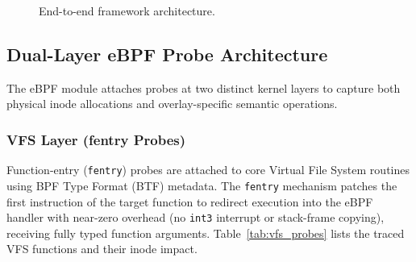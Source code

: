 \documentclass[conference]{IEEEtran}
\begin{document}
\begin{figure}[!htbp]
    \centering
    
    \caption{End-to-end framework architecture.}
    \label{fig:architecture}
\end{figure}

\subsection{Dual-Layer eBPF Probe Architecture}
\label{subsec:probes}

The eBPF module attaches probes at two distinct kernel layers to capture both physical inode allocations and overlay-specific semantic operations.

\subsubsection{VFS Layer (fentry Probes)}
Function-entry (\texttt{fentry}) probes are attached to core Virtual File System routines using BPF Type Format (BTF) metadata. The \texttt{fentry} mechanism patches the first instruction of the target function to redirect execution into the eBPF handler with near-zero overhead (no \texttt{int3} interrupt or stack-frame copying), receiving fully typed function arguments. Table~\ref{tab:vfs_probes} lists the traced VFS functions and their inode impact.

\begin{table}[t]
\centering
\caption{VFS-layer probes attached via \texttt{fentry}.}
\label{tab:vfs_probes}
\small
{}
\end{table}
\end{document}
